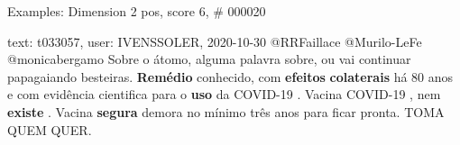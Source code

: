 \begin{frame}{Examples: Dimension 2 pos, score 6, \# 000020}
\footnotesize
\begin{exampleblock}{text: t033057, user: IVENSSOLER, 2020-10-30}
@RRFaillace @Murilo-LeFe @monicabergamo Sobre o átomo, alguma palavra sobre, ou 
vai continuar papagaiando besteiras. \textbf{Remédio} conhecido, com 
\textbf{efeitos} \textbf{colaterais} há 80 anos e com evidência cientifica para 
o \textbf{uso} da COVID-19 . Vacina COVID-19 , nem \textbf{existe} . Vacina 
\textbf{segura} demora no mínimo três anos para ficar pronta. TOMA QUEM QUER. 
\end{exampleblock}
\end{frame}

